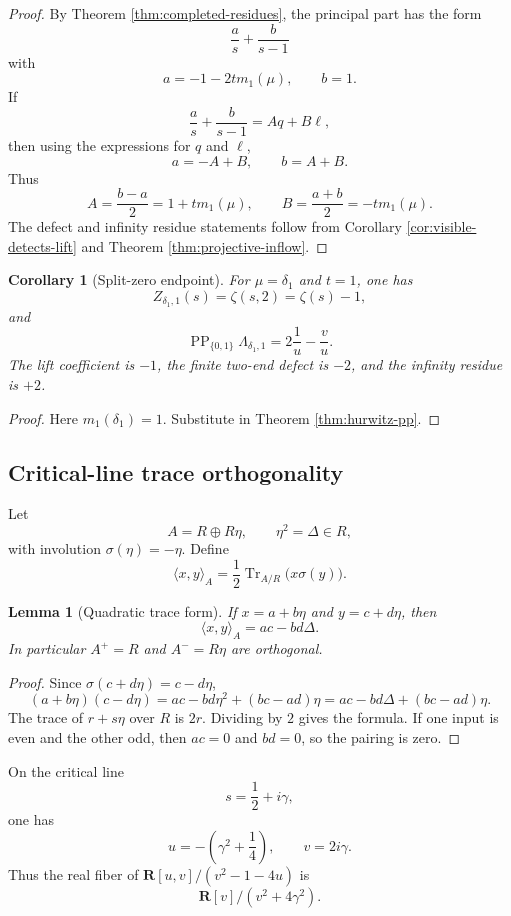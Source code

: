 \documentclass[11pt]{article}
\newcommand{\R}{\mathbf R}
\newcommand{\PP}{\operatorname{PP}}
\newcommand{\Tr}{\operatorname{Tr}}
\theoremstyle{plain}
\newtheorem{lemma}[theorem]{Lemma}
\newtheorem{corollary}[theorem]{Corollary}
\theoremstyle{definition}
\begin{document}
\begin{proof}
By Theorem \ref{thm:completed-residues}, the principal part has the form
\[
   \frac a s+\frac b{s-1}
\]
with
\[
   a=-1-2tm_1(\mu),
   \qquad
   b=1.
\]
If
\[
   \frac a s+\frac b{s-1}=Aq+B\ell,
\]
then using the expressions for \(q\) and \(\ell\),
\[
   a=-A+B,
   \qquad
   b=A+B.
\]
Thus
\[
   A=\frac{b-a}{2}=1+tm_1(\mu),
   \qquad
   B=\frac{a+b}{2}=-tm_1(\mu).
\]
The defect and infinity residue statements follow from Corollary \ref{cor:visible-detects-lift} and Theorem \ref{thm:projective-inflow}.
\end{proof}

\begin{corollary}[Split-zero endpoint]\label{cor:split-zero-endpoint}
For \(\mu=\delta_1\) and \(t=1\), one has
\[
   Z_{\delta_1,1}(s)=\zeta(s,2)=\zeta(s)-1,
\]
and
\[
   \PP_{\{0,1\}}\Lambda_{\delta_1,1}=2\frac1u-\frac vu.
\]
The lift coefficient is \(-1\), the finite two-end defect is \(-2\), and the infinity residue is \(+2\).
\end{corollary}

\begin{proof}
Here \(m_1(\delta_1)=1\).  Substitute in Theorem \ref{thm:hurwitz-pp}.
\end{proof}

\subsection{Critical-line trace orthogonality}

Let
\[
   A=R\oplus R\eta,
   \qquad
   \eta^2=\Delta\in R,
\]
with involution \(\sigma(\eta)=-\eta\).  Define
\[
   \langle x,y\rangle_A=\frac12\Tr_{A/R}\bigl(x\sigma(y)\bigr).
\]

\begin{lemma}[Quadratic trace form]\label{lem:quadratic-trace}
If \(x=a+b\eta\) and \(y=c+d\eta\), then
\[
   \langle x,y\rangle_A=ac-bd\Delta.
\]
In particular \(A^+=R\) and \(A^-=R\eta\) are orthogonal.
\end{lemma}

\begin{proof}
Since \(\sigma(c+d\eta)=c-d\eta\),
\[
   (a+b\eta)(c-d\eta)=ac-bd\eta^2+(bc-ad)\eta=ac-bd\Delta+(bc-ad)\eta.
\]
The trace of \(r+s\eta\) over \(R\) is \(2r\).  Dividing by \(2\) gives the formula.  If one input is even and the other odd, then \(ac=0\) and \(bd=0\), so the pairing is zero.
\end{proof}

On the critical line
\[
   s=\frac12+i\gamma,
\]
one has
\[
   u=-\left(\gamma^2+\frac14\right),
   \qquad
   v=2i\gamma.
\]
Thus the real fiber of \(\R[u,v]/(v^2-1-4u)\) is
\[
   \R[v]/(v^2+4\gamma^2).
\]
\end{document}
